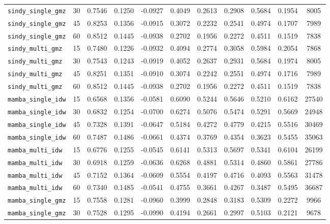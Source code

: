 \documentclass[12pt, a4paper]{article}
\begin{document}
{\begin{longtable}{p{4.0cm}cccccccccc}
\texttt{sindy\_single\_gmz} & 30 & 0.7546 & 0.1250 & -0.0927 & 0.4049 & 0.2613 & 0.2908 & 0.5684 & 0.1954 & 8005 \\
\texttt{sindy\_single\_gmz} & 45 & 0.8253 & 0.1356 & -0.0915 & 0.3072 & 0.2232 & 0.2541 & 0.4974 & 0.1707 & 7989 \\
\texttt{sindy\_single\_gmz} & 60 & 0.8512 & 0.1445 & -0.0938 & 0.2702 & 0.1956 & 0.2272 & 0.4511 & 0.1519 & 7838 \\
\addlinespace[1pt]
\texttt{sindy\_multi\_gmz} & 15 & 0.7480 & 0.1226 & -0.0932 & 0.4094 & 0.2774 & 0.3058 & 0.5984 & 0.2054 & 7868 \\
\texttt{sindy\_multi\_gmz} & 30 & 0.7543 & 0.1243 & -0.0919 & 0.4052 & 0.2637 & 0.2931 & 0.5684 & 0.1974 & 8005 \\
\texttt{sindy\_multi\_gmz} & 45 & 0.8251 & 0.1351 & -0.0910 & 0.3074 & 0.2242 & 0.2551 & 0.4974 & 0.1716 & 7989 \\
\texttt{sindy\_multi\_gmz} & 60 & 0.8512 & 0.1445 & -0.0938 & 0.2702 & 0.1956 & 0.2272 & 0.4511 & 0.1519 & 7838 \\
\addlinespace[1pt]
\texttt{mamba\_single\_idw} & 15 & 0.6568 & 0.1356 & -0.0581 & 0.6090 & 0.5244 & 0.5646 & 0.5210 & 0.6162 & 27540 \\
\texttt{mamba\_single\_idw} & 30 & 0.6832 & 0.1254 & -0.0700 & 0.6274 & 0.5076 & 0.5474 & 0.5291 & 0.5669 & 24948 \\
\texttt{mamba\_single\_idw} & 45 & 0.7328 & 0.1391 & -0.0647 & 0.5184 & 0.4272 & 0.4779 & 0.4215 & 0.5516 & 30469 \\
\texttt{mamba\_single\_idw} & 60 & 0.7487 & 0.1486 & -0.0661 & 0.4374 & 0.3769 & 0.4354 & 0.3623 & 0.5455 & 35063 \\
\addlinespace[1pt]
\texttt{mamba\_multi\_idw} & 15 & 0.6776 & 0.1255 & -0.0545 & 0.6141 & 0.5313 & 0.5697 & 0.5341 & 0.6104 & 26199 \\
\texttt{mamba\_multi\_idw} & 30 & 0.6918 & 0.1259 & -0.0636 & 0.6268 & 0.4881 & 0.5314 & 0.4860 & 0.5861 & 27786 \\
\texttt{mamba\_multi\_idw} & 45 & 0.7152 & 0.1364 & -0.0609 & 0.5554 & 0.4197 & 0.4716 & 0.4093 & 0.5563 & 31478 \\
\texttt{mamba\_multi\_idw} & 60 & 0.7340 & 0.1485 & -0.0541 & 0.4755 & 0.3661 & 0.4267 & 0.3487 & 0.5495 & 36687 \\
\addlinespace[1pt]
\texttt{mamba\_single\_gmz} & 15 & 0.7558 & 0.1281 & -0.0960 & 0.3999 & 0.2848 & 0.3183 & 0.5309 & 0.2272 & 9966 \\
\texttt{mamba\_single\_gmz} & 30 & 0.7528 & 0.1295 & -0.0990 & 0.4194 & 0.2661 & 0.2997 & 0.5103 & 0.2121 & 9678 \\

\end{longtable}}
\end{document}
